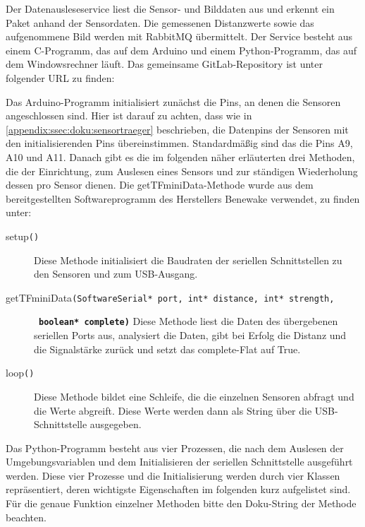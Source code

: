 Der Datenausleseservice liest die Sensor- und Bilddaten aus und erkennt ein Paket anhand der Sensordaten. Die gemessenen Distanzwerte sowie das aufgenommene Bild werden mit RabbitMQ übermittelt. Der Service besteht aus einem C-Programm, das auf dem Arduino und einem Python-Programm, das auf dem Windowsrechner läuft. Das gemeinsame GitLab-Repository ist unter folgender URL zu finden:


Das Arduino-Programm initialisiert zunächst die Pins, an denen die Sensoren angeschlossen sind. Hier ist darauf zu achten, dass wie in \vref{appendix:ssec:doku:sensortraeger} beschrieben, die Datenpins der Sensoren mit den initialisierenden Pins übereinstimmen. Standardmäßig sind das die Pins A9, A10 und A11. Danach gibt es die im folgenden näher erläuterten drei Methoden, die der Einrichtung, zum Auslesen eines Sensors und zur ständigen Wiederholung dessen pro Sensor dienen. Die getTFminiData-Methode wurde aus dem bereitgestellten Softwareprogramm des Herstellers Benewake verwendet, zu finden unter:


\begin{description}
  \item[setup\texttt{()}] Diese Methode initialisiert die Baudraten der seriellen Schnittstellen zu den Sensoren und zum USB-Ausgang.
  \item[getTFminiData\texttt{(SoftwareSerial* port, int* distance, int* strength,}] \ \linebreak\textbf{\texttt{boolean* complete)}} Diese Methode liest die Daten des übergebenen seriellen Ports aus, analysiert die Daten, gibt bei Erfolg die Distanz und die Signalstärke zurück und setzt das complete-Flat auf True.
  \item[loop\texttt{()}] Diese Methode bildet eine Schleife, die die einzelnen Sensoren abfragt und die Werte abgreift. Diese Werte werden dann als String über die USB-Schnittstelle ausgegeben.
\end{description}

Das Python-Programm besteht aus vier Prozessen, die nach dem Auslesen der Umgebungsvariablen und dem Initialisieren der seriellen Schnittstelle ausgeführt werden. Diese vier Prozesse und die Initialisierung werden durch vier Klassen repräsentiert, deren wichtigste Eigenschaften im folgenden kurz aufgelistet sind. Für die genaue Funktion einzelner Methoden bitte den Doku-String der Methode beachten.


